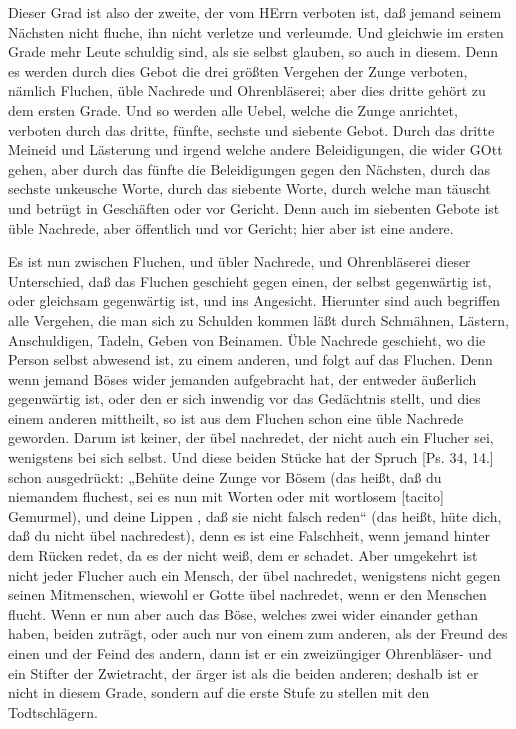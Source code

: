 Dieser Grad ist also der zweite, der vom HErrn verboten ist, daß jemand seinem Nächsten nicht fluche, ihn nicht verletze und verleumde. Und gleichwie im ersten Grade mehr Leute schuldig sind, als sie selbst glauben, so auch in diesem. Denn es werden durch dies Gebot die drei größten Vergehen der Zunge verboten, nämlich Fluchen, üble Nachrede und Ohrenbläserei; aber dies dritte gehört zu dem ersten Grade. Und so werden alle Uebel, welche die Zunge anrichtet, verboten durch das dritte, fünfte, sechste und siebente Gebot. Durch das dritte Meineid und Lästerung und irgend welche andere Beleidigungen, die wider GOtt gehen, aber durch das fünfte die Beleidigungen gegen den Nächsten, durch das sechste unkeusche Worte, durch das siebente Worte, durch welche man täuscht und betrügt in Geschäften oder vor Gericht. Denn auch im siebenten Gebote ist üble Nachrede, aber öffentlich und vor Gericht; hier aber ist eine andere.

Es ist nun zwischen Fluchen, und übler Nachrede, und Ohrenbläserei dieser Unterschied, daß das Fluchen geschieht gegen einen, der selbst gegenwärtig ist, oder gleichsam gegenwärtig ist, und ins Angesicht. Hierunter sind auch begriffen alle Vergehen, die man sich zu Schulden kommen läßt durch Schmähnen, Lästern, Anschuldigen, Tadeln, Geben von Beinamen. Üble Nachrede geschieht, wo die Person selbst abwesend ist, zu einem anderen, und folgt auf das Fluchen. Denn wenn jemand Böses wider jemanden aufgebracht hat, der entweder äußerlich gegenwärtig ist, oder den er sich inwendig vor das Gedächtnis stellt, und dies einem anderen mittheilt, so ist aus dem Fluchen schon eine üble Nachrede geworden. Darum ist keiner, der übel nachredet, der nicht auch ein Flucher sei, wenigstens bei sich selbst. Und diese beiden Stücke hat der Spruch [Ps. 34, 14.] schon ausgedrückt: „Behüte deine Zunge vor Bösem (das heißt, daß du niemandem fluchest, sei es nun mit Worten oder mit wortlosem [tacito] Gemurmel), und deine Lippen
, daß sie nicht falsch reden“ (das heißt, hüte dich, daß du nicht übel nachredest), denn es ist eine Falschheit, wenn jemand hinter dem Rücken redet, da es der nicht weiß, dem er schadet. Aber umgekehrt ist nicht jeder Flucher auch ein Mensch, der übel nachredet, wenigstens nicht gegen seinen Mitmenschen, wiewohl er Gotte übel nachredet, wenn er den Menschen flucht. Wenn er nun aber auch das Böse, welches zwei wider einander gethan haben, beiden zuträgt, oder auch nur von einem zum anderen, als der Freund des einen und der Feind des andern, dann ist er ein zweizüngiger Ohrenbläser- und ein Stifter der Zwietracht, der ärger ist als die beiden anderen; deshalb ist er nicht in diesem Grade, sondern auf die erste Stufe zu stellen mit den Todtschlägern.

